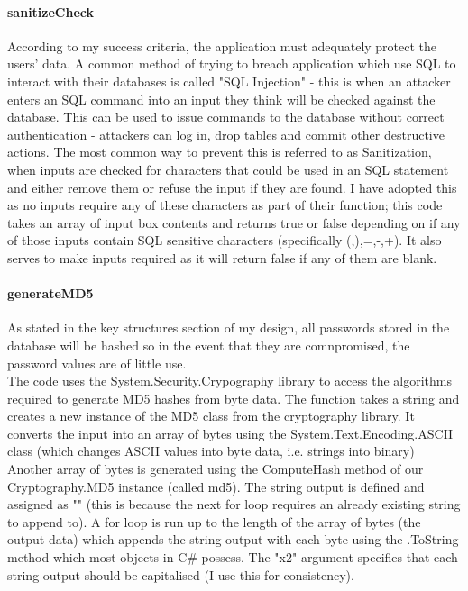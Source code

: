 ﻿\documentclass{article}
\begin{document}
    \paragraph{sanitizeCheck}
    According to my success criteria, the application must adequately protect the users' data.
    A common method of trying to breach application which use SQL to interact with their databases is called "SQL Injection" - this is when an attacker enters an SQL command into an input they think will be checked against the database.
    This can be used to issue commands to the database without correct authentication - attackers can log in, drop tables and commit other destructive actions.
    The most common way to prevent this is referred to as Sanitization, when inputs are checked for characters that could be used in an SQL statement and either remove them or refuse the input if they are found.
    I have adopted this as no inputs require any of these characters as part of their function; this code takes an array of input box contents and returns true or false depending on if any of those inputs contain SQL sensitive characters (specifically (,),=,-,+).
    It also serves to make inputs required as it will return false if any of them are blank.
    \paragraph{generateMD5}
    As stated in the key structures section of my design, all passwords stored in the database will be hashed so in the event that they are comnpromised, the password values are of little use.
    \\
    The code uses the System.Security.Crypography library to access the algorithms required to generate MD5 hashes from byte data.
    The function takes a string and creates a new instance of the MD5 class from the cryptography library.
    It converts the input into an array of bytes using the System.Text.Encoding.ASCII class (which changes ASCII values into byte data, i.e. strings into binary)
    Another array of bytes is generated using the ComputeHash method of our Cryptography.MD5 instance (called md5).
    The string output is defined and assigned as "" (this is because the next for loop requires an already existing string to append to).
    A for loop is run up to the length of the array of bytes (the output data) which appends the string output with each byte using the .ToString method which most objects in C# possess.
    The "x2" argument specifies that each string output should be capitalised (I use this for consistency).
\end{document}
